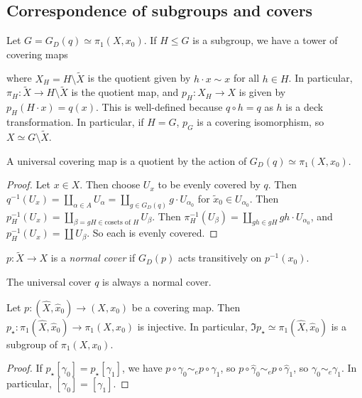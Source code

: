 \subsection{Correspondence of subgroups and covers}
\begin{proposition}
	Let \( G = G_D(q) \simeq \pi_1(X, x_0) \).
	If \( H \leq G \) is a subgroup, we have a tower of covering maps
	\begin{center}
	\end{center}
	where \( X_H = H \setminus \widetilde X \) is the quotient given by \( h \cdot x \sim x \) for all \( h \in H \).
	In particular, \( \pi_H \colon \widetilde X \to H \setminus \widetilde X \) is the quotient map, and \( p_H \colon X_H \to X \) is given by \( p_H(H \cdot x) = q(x) \).
	This is well-defined because \( q \circ h = q \) as \( h \) is a deck transformation.
	In particular, if \( H = G \), \( p_G \) is a covering isomorphism, so \( X \simeq G \setminus \widetilde X \).
\end{proposition}
A universal covering map is a quotient by the action of \( G_D(q) \simeq \pi_1(X,x_0) \).
\begin{proof}
	Let \( x \in X \).
	Then choose \( U_x \) to be evenly covered by \( q \).
	Then \( q^{-1}(U_x) = \coprod_{\alpha \in A} U_\alpha = \coprod_{g \in G_D(q)} g \cdot U_{\alpha_0} \) for \( \widetilde x_0 \in U_{\alpha_0} \).
	Then \( p_H^{-1}(U_x) = \coprod_{\beta = gH \in \text{cosets of } H} U_\beta \).
	Then \( \pi_H^{-1}(U_\beta) = \coprod_{gh \in gH} gh \cdot U_{\alpha_0} \), and \( p_H^{-1}(U_x) = \coprod U_\beta \).
	So each is evenly covered.
\end{proof}
\begin{definition}
	\( p \colon \widetilde X \to X \) is a \emph{normal cover} if \( G_D(p) \) acts transitively on \( p^{-1}(x_0) \).
\end{definition}
\begin{example}
	The universal cover \( q \) is always a normal cover.
\end{example}
\begin{proposition}
	Let \( p \colon (\hat X, \hat x_0) \to (X, x_0) \) be a covering map.
	Then \( p_\star \colon \pi_1(\hat X, \hat x_0) \to \pi_1(X, x_0) \) is injective.
	In particular, \( \Im p_\star \simeq \pi_1(\hat X, \hat x_0) \) is a subgroup of \( \pi_1(X, x_0) \).
\end{proposition}
\begin{proof}
	If \( p_\star[\gamma_0] = p_\star[\gamma_1] \), we have \( p \circ \gamma_0 \sim_e p \circ \gamma_1 \), so \( p \circ \hat\gamma_0 \sim_e p \circ \hat\gamma_1 \), so \( \gamma_0 \sim_e \gamma_1 \).
	In particular, \( [\gamma_0] = [\gamma_1] \).
\end{proof}

